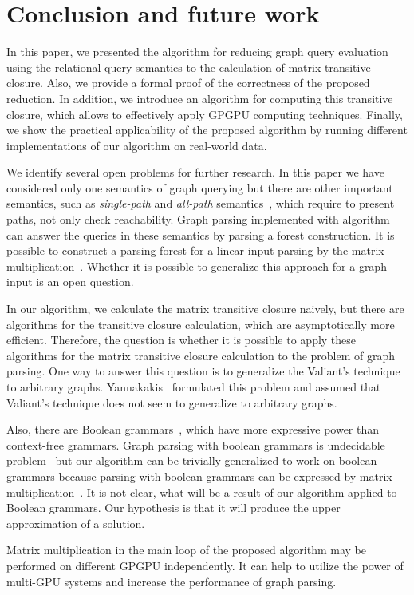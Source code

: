 \section{Conclusion and future work}
In this paper, we presented the algorithm for reducing graph query evaluation using the relational query semantics to the calculation of matrix transitive closure. Also, we provide a formal proof of the correctness of the proposed reduction. In addition, we introduce an algorithm for computing this transitive closure, which allows to effectively apply GPGPU computing techniques. Finally, we show the practical applicability of the proposed algorithm by running different implementations of our algorithm on real-world data.

We identify several open problems for further research. In this paper we have considered only one semantics of graph querying but there are other important semantics, such as \textit{single-path} and \textit{all-path} semantics~\cite{hellingsPathQuerying}, which require to present paths, not only check reachability. Graph parsing implemented with algorithm~\cite{GLL} can answer the queries in these semantics by parsing a forest construction. It is possible to construct a parsing forest for a linear input parsing by the matrix multiplication~\cite{okhotin_cyk}. Whether it is possible to generalize this approach for a graph input is an open question.

In our algorithm, we calculate the matrix transitive closure naively, but there are algorithms for the transitive closure calculation, which are asymptotically more efficient. Therefore, the question is whether it is possible to apply these algorithms for the matrix transitive closure calculation to the problem of graph parsing. One way to answer this question is to generalize the Valiant's technique to arbitrary graphs. Yannakakis~\cite{transitive-closure} formulated this problem and assumed that Valiant's technique does not seem to generalize to arbitrary graphs.

Also, there are Boolean grammars~\cite{okhotinBoolean}, which have more expressive power than context-free grammars. Graph parsing with boolean grammars is undecidable problem~\cite{hellingsRelational} but our algorithm can be trivially generalized to work on boolean grammars because parsing with boolean grammars can be expressed by matrix multiplication~\cite{okhotin_cyk}. It is not clear, what will be a result of our algorithm applied to Boolean grammars. Our hypothesis is that it will produce the upper approximation of a solution.

Matrix multiplication in the main loop of the proposed algorithm may be performed on different GPGPU independently. It can help to utilize the power of multi-GPU systems and increase the performance of graph parsing.